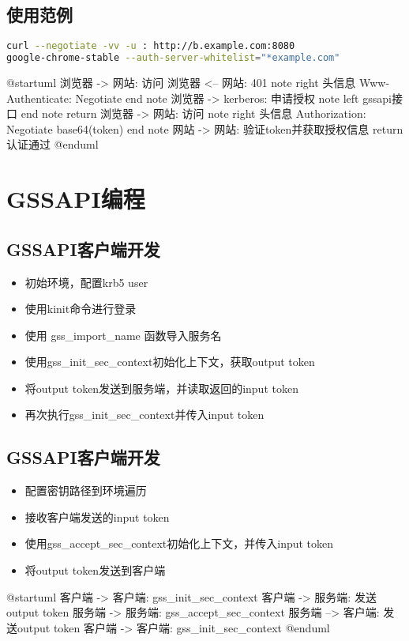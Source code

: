 \documentclass[a4paper]{scrartcl}
\begin{document}
\subsection{使用范例}
\begin{lstlisting}[language={bash}]
curl --negotiate -vv -u : http://b.example.com:8080
google-chrome-stable --auth-server-whitelist="*example.com"
\end{lstlisting}

\begin{plantuml}
    @startuml
        浏览器 -> 网站: 访问
        浏览器 <-- 网站: 401
        note right
        头信息
        Www-Authenticate: Negotiate
        end note
        浏览器 -> kerberos: 申请授权
        note left
        gssapi接口
        end note
        return
        浏览器 -> 网站: 访问
        note right
        头信息
        Authorization: Negotiate base64(token)
        end note
        网站 -> 网站: 验证token并获取授权信息
        return 认证通过
    @enduml
\end{plantuml}
\clearpage
\section{GSSAPI编程}
\subsection{GSSAPI客户端开发}

\begin{itemize}
    \item 初始环境，配置krb5 user
    \item 使用kinit命令进行登录
    \item 使用 gss\_import\_name 函数导入服务名
    \item 使用gss\_init\_sec\_context初始化上下文，获取output token
    \item 将output token发送到服务端，并读取返回的input token
    \item 再次执行gss\_init\_sec\_context并传入input token
\end{itemize}

\subsection{GSSAPI客户端开发}
\begin{itemize}
    \item 配置密钥路径到环境遍历
    \item 接收客户端发送的input token
    \item 使用gss\_accept\_sec\_context初始化上下文，并传入input token
    \item 将output token发送到客户端
\end{itemize}
\begin{plantuml}
    @startuml
    客户端 -> 客户端: gss_init_sec_context
    客户端 -> 服务端: 发送output token
    服务端 -> 服务端: gss_accept_sec_context
    服务端 --> 客户端: 发送output token
    客户端 -> 客户端: gss_init_sec_context
    @enduml
\end{plantuml}
\clearpage
\end{document}
